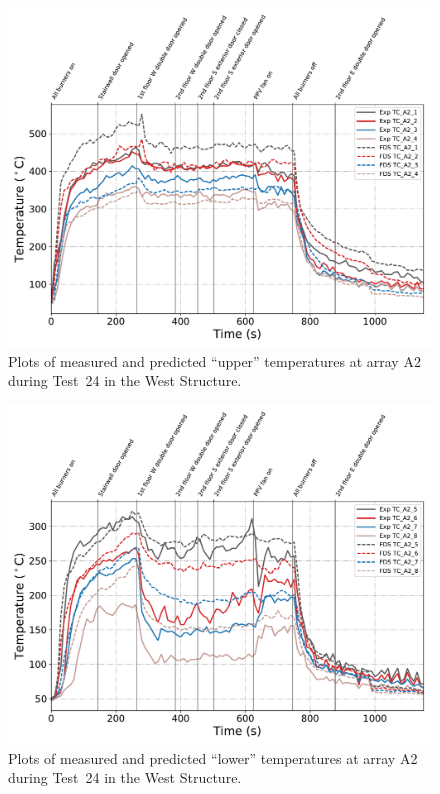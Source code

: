 \begin{figure}[!h]
	\centering
	\includegraphics[width=\columnwidth]{Figures/Plots/Validation/Temperature/Test_24_TC_A2_upper}
	\caption{Plots of measured and predicted ``upper'' temperatures at array A2 during Test~24 in the West Structure.}
	\label{fig:TCA2_upper_data_Test24}
\end{figure}

\begin{figure}[!h]
	\centering
	\includegraphics[width=\columnwidth]{Figures/Plots/Validation/Temperature/Test_24_TC_A2_lower}
	\caption{Plots of measured and predicted ``lower'' temperatures at array A2 during Test~24 in the West Structure.}
	\label{fig:TCA2_lower_data_Test24}
\end{figure}

